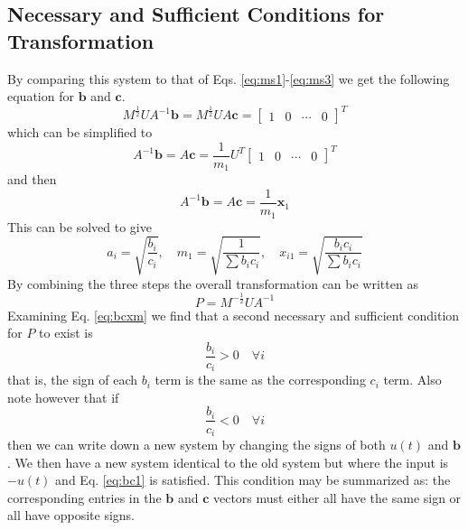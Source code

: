 \documentclass{beamer}
\begin{document}
\subsection{Necessary and Sufficient Conditions for Transformation}
\begin{frame}
By comparing this system to that of Eqs. \ref{eq:ms1}-\ref{eq:ms3} we get the following equation for $\mathbf{b}$ and $\mathbf{c}$.
\begin{equation}
M^{\frac{1}{2}} U A^{-1} \mathbf{b} = M^{\frac{1}{2}} U A \mathbf{c} = \begin{bmatrix} 1 &  0 & \cdots & 0 \end{bmatrix}^T
\label{eq:bhat}
\end{equation}
which can be simplified to
\begin{equation}
A^{-1} \mathbf{b} = A \mathbf{c} = \frac{1}{m_1} U^T \begin{bmatrix} 1 &  0 & \cdots & 0 \end{bmatrix}^T
\label{eq:bc1}
\end{equation}
and then
\begin{equation}
A^{-1} \mathbf{b} = A \mathbf{c} = \frac{1}{m_1} \mathbf{x}_1
\label{eq:bc2}
\end{equation}
This can be solved to give
\begin{equation}
a_i = \sqrt{\frac{b_i}{c_i}} ,\quad m_1 = \sqrt{\frac{1}{\sum b_i c_i}} ,\quad x_{i1} = \sqrt{\frac{b_i c_i}{\sum b_i c_i}}
\label{eq:bcxm}
\end{equation}
By combining the three steps the overall transformation can be written as
\begin{equation}
P =  M^{-\frac{1}{2}} U A^{-1}
\label{eq:p}
\end{equation}
Examining Eq. \ref{eq:bcxm} we find that a second necessary and sufficient condition for $P$ to exist is
\begin{equation}
\frac{b_i}{c_i} > 0 \quad \forall i
\label{eq:bc1}
\end{equation}
that is, the sign of each $b_i$ term is the same as the corresponding $c_i$ term. 
Also note however that if
\begin{equation}
\frac{b_i}{c_i} < 0 \quad \forall i
\label{eq:bc2}
\end{equation}
then we can write down a new system by changing the signs of both $u(t)$ and $\mathbf{b}$. We then have a new system identical to the old system but where the input is $-u(t)$ and Eq. \ref{eq:bc1} is satisfied.
This condition may be summarized as: the corresponding entries in the $\mathbf{b}$ and $\mathbf{c}$ vectors must either all have the same sign or all have opposite signs.
\end{frame}
\end{document}
